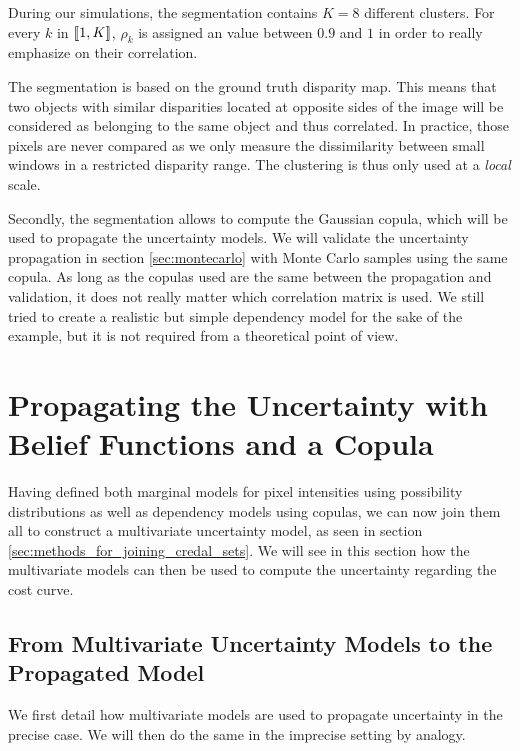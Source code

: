 During our simulations, the segmentation contains $K=8$ different clusters. For every $k$ in ${[\![}1,K{]\!]}$, $\rho_k$ is assigned an value between $0.9$ and $1$ in order to really emphasize on their correlation.

\begin{remark}
    The segmentation is based on the ground truth disparity map. This means that two objects with similar disparities located at opposite sides of the image will be considered as belonging to the same object and thus correlated. In practice, those pixels are never compared as we only measure the dissimilarity between small windows in a restricted disparity range. The clustering is thus only used at a \textit{local} scale. 
    
    Secondly, the segmentation allows to compute the Gaussian copula, which will be used to propagate the uncertainty models. We will validate the uncertainty propagation in section \ref{sec:montecarlo} with Monte Carlo samples using the same copula. As long as the copulas used are the same between the propagation and validation, it does not really matter which correlation matrix is used. We still tried to create a realistic but simple dependency model for the sake of the example, but it is not required from a theoretical point of view.
\end{remark}

\section{Propagating the Uncertainty with Belief Functions and a Copula}
Having defined both marginal models for pixel intensities using possibility distributions as well as dependency models using copulas, we can now join them all to construct a multivariate uncertainty model, as seen in section \ref{sec:methods_for_joining_credal_sets}. We will see in this section how the multivariate models can then be used to compute the uncertainty regarding the cost curve. 

\subsection{From Multivariate Uncertainty Models to the Propagated Model}
We first detail how multivariate models are used to propagate uncertainty in the precise case. We will then do the same in the imprecise setting by analogy.

